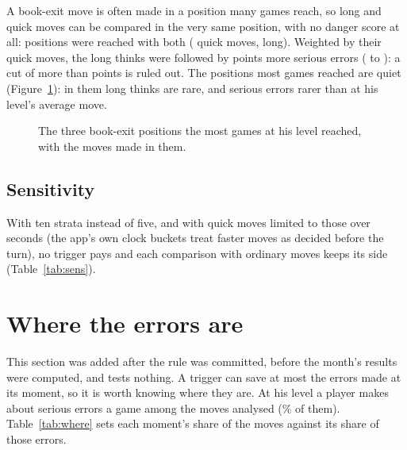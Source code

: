 \documentclass[11pt]{article}
\begin{document}
A book-exit move is often made in a position many games reach, so long and quick moves can be
compared in the very same position, with no danger score at all: \SamePositions{} positions were
reached with both (\SameQuick{} quick moves, \SameLong{} long). Weighted by their quick moves, the
long thinks were followed by \SameDelta{} points more serious errors (\SameLo{} to \SameHi): a cut
of more than \SameCutBound{} points is ruled out. The positions most games reached are
quiet (Figure~\ref{fig:same}): in them long thinks are rare, and serious errors rarer than at his
level's average move.

\begin{figure}[h]
\centering
\SameBoards
\caption{The three book-exit positions the most games at his level reached, with the moves made
in them.}
\label{fig:same}
\end{figure}

\subsection{Sensitivity}

With ten strata instead of five, and with quick moves limited to those over \Decided{} seconds (the
app's own clock buckets treat faster moves as decided before the turn), no trigger pays and each
comparison with ordinary moves keeps its side (Table~\ref{tab:sens}).

\begin{table}[h]
\centering
\small\setlength{\tabcolsep}{4pt}\SensitivityTable
\caption{The triggers' $\Delta$ and $\Delta - \Delta_{\text{none}}$ under two other choices.}
\label{tab:sens}
\end{table}

\section{Where the errors are}

This section was added after the rule was committed, before the month's results were computed, and
tests nothing. A trigger can save at most the errors made at its moment, so it is worth knowing
where they are. At his level a player makes about \ErrorsPerGame{} serious errors a game among the
moves analysed (\SeriousRate\% of them). Table~\ref{tab:where} sets each moment's share of the
moves against its share of those errors.

\begin{table}[h]
\centering
\small\ConcentrationTable
\caption{Each moment's share of the moves analysed at his level and of their serious errors, at
every length of think. Ratio: the second over the first. The candidates overlap.}
\label{tab:where}
\end{table}
\end{document}
